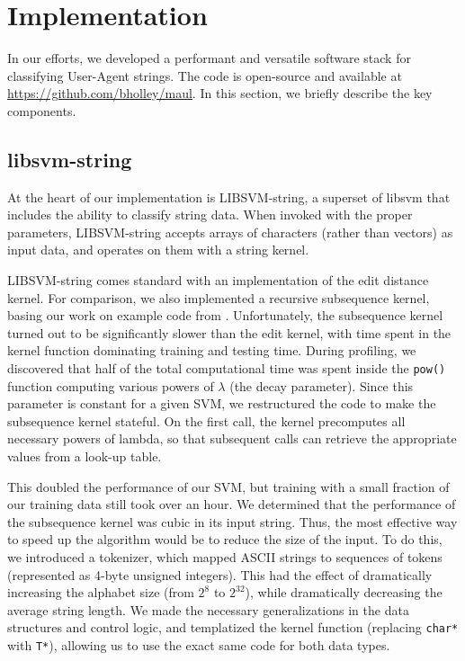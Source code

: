 \documentclass[10pt]{article}
\begin{document}
\section{Implementation}

In our efforts, we developed a performant and versatile software stack for classifying User-Agent strings. The code is open-source and available at \url{https://github.com/bholley/maul}. In this section, we briefly describe the key components.


\subsection{libsvm-string}

At the heart of our implementation is LIBSVM-string, a superset of libsvm that includes the ability to classify string data. \cite{libsvm-string} When invoked with the proper parameters, LIBSVM-string accepts arrays of characters (rather than vectors) as input data, and operates on them with a string kernel.

LIBSVM-string comes standard with an implementation of the edit distance kernel. For comparison, we also implemented a recursive subsequence kernel, basing our work on example code from \cite{learning-kernel-classifiers}. Unfortunately, the subsequence kernel turned out to be significantly slower than the edit kernel, with time spent in the kernel function dominating training and testing time. During profiling, we discovered that half of the total computational time was spent inside the \texttt{pow()} function computing various powers of $\lambda$ (the decay parameter). Since this parameter is constant for a given SVM, we restructured the code to make the subsequence kernel stateful. On the first call, the kernel precomputes all necessary powers of lambda, so that subsequent calls can retrieve the appropriate values from a look-up table.

This doubled the performance of our SVM, but training with a small fraction of our training data still took over an hour. We determined that the performance of the subsequence kernel was cubic in its input string. Thus, the most effective way to speed up the algorithm would be to reduce the size of the input. To do this, we introduced a tokenizer, which mapped ASCII strings to sequences of tokens (represented as 4-byte unsigned integers). This had the effect of dramatically increasing the alphabet size (from $2^8$ to $2^{32}$), while dramatically decreasing the average string length. We made the necessary generalizations in the data structures and control logic, and templatized the kernel function (replacing \texttt{char*} with \texttt{T*}), allowing us to use the exact same code for both data types.
\end{document}
